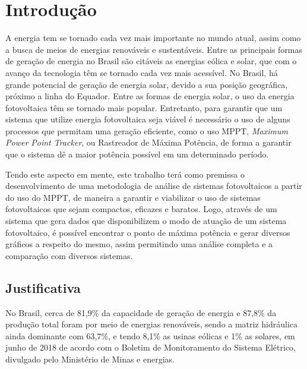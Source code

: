 \chapter{Introdução}
\label{cap:01}
A energia tem se tornado cada vez mais importante no mundo atual, assim como a busca de meios de energias renováveis e sustentáveis. Entre as principais formas de geração de energia no Brasil são citáveis as energias eólica e solar, que com o avanço da tecnologia têm se tornado cada vez mais acessível. No Brasil, há grande potencial de geração de energia solar, devido a sua posição geográfica, próximo a linha do Equador. Entre as formas de energia solar, o uso da energia fotovoltaica têm se tornado mais popular. Entretanto, para garantir que um sistema que utilize energia fotovoltaica seja viável é necessário o uso de alguns processos que permitam uma geração eficiente, como o uso MPPT, \textit{Maximum Power Point Tracker}, ou Rastreador de Máxima Potência, de forma a garantir que o sistema dê a maior potência possível em um determinado período.

\indent		Tendo este aspecto em mente, este trabalho terá como premissa o desenvolvimento de uma metodologia de análise de sistemas fotovoltaicos a partir do uso do MPPT, de maneira a garantir e viabilizar o uso de sistemas fotovoltaicos que sejam compactos, eficazes e baratos.
Logo, através de um sistema que gera dados que disponibilizem o modo de atuação de um sistema fotovoltaico, é possível encontrar o ponto de máxima potência e gerar diversos gráficos a respeito do mesmo, assim permitindo uma análise completa e a comparação com diversos sistemas.


\section{Justificativa}

No Brasil, cerca de 81,9\% da capacidade de geração de energia e 87,8\% da produção total foram por meio de energias renováveis, sendo a matriz hidráulica ainda dominante com 63,7\%, e tendo 8,1\% as usinas eólicas e 1\% as solares, em junho de 2018 de acordo com o Boletim de Monitoramento do Sistema Elétrico, divulgado pelo Ministério de Minas e energias.%

